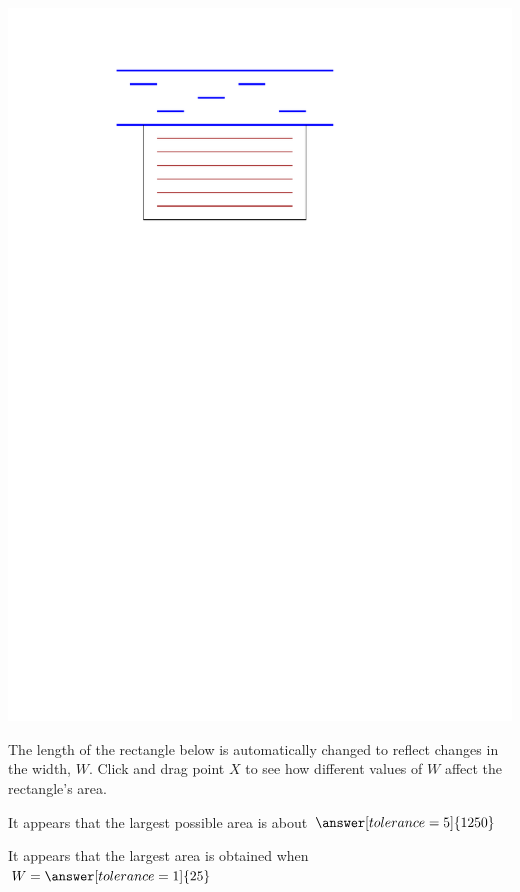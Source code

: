 \documentclass{ximera}
\begin{document}
\begin{center}
\includegraphics[scale=0.5]{GardenFig}
\end{center}

\begin{exploration}
The length of the rectangle below is automatically changed to reflect changes in the width, $W$. Click and drag point $X$ to see how different values of $W$ affect the rectangle's area.


\begin{problem}
It appears that the largest possible area is about $\answer[tolerance=5]{1250}$
\end{problem}

\begin{problem}
It appears that the largest area is obtained when $W = \answer[tolerance=1]{25}$
\end{problem}
\end{exploration}
\end{document}
